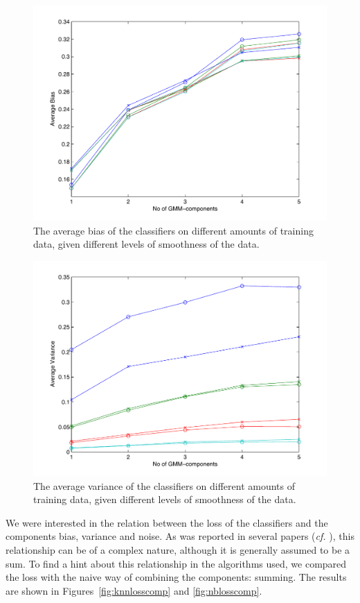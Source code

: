 \documentclass[a4paper]{article}
\begin{document}
\begin{figure}[H!]
    \centering
    \includegraphics[width=.9\textwidth]{bias_vs.pdf}
    \caption{The average bias of the classifiers on different amounts of training data, given different levels of smoothness of the data. \label{fig:bias}}
\end{figure}

\begin{figure}[H!]
    \centering
    \includegraphics[width=.9\textwidth]{var_vs.pdf}
    \caption{The average variance of the classifiers on different amounts of training data, given different levels of smoothness of the data. \label{fig:var}}
\end{figure}

We were interested in the relation between the loss of the classifiers and the components bias, variance and noise. As was reported in several papers (\emph{cf.} \cite{Domingos2000}), this relationship can be of a complex nature, although it is generally assumed to be a sum. To find a hint about this relationship in the algorithms used, we compared the loss with the naive way of combining the components: summing. The results are shown in Figures~\ref{fig:knnlosscomp} and \ref{fig:nblosscomp}.
\end{document}
